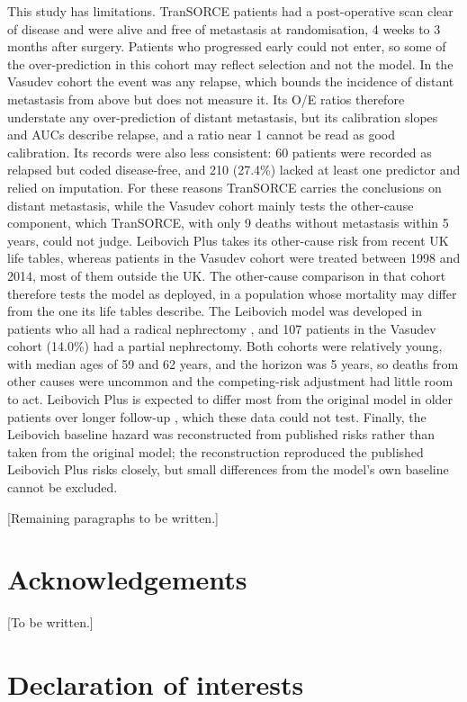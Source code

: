 \documentclass[11pt,a4paper]{article}
\begin{document}
This study has limitations.
TranSORCE patients had a post-operative scan clear of disease and were alive and free of metastasis at randomisation, 4 weeks to 3 months after surgery.
Patients who progressed early could not enter, so some of the over-prediction in this cohort may reflect selection and not the model.
In the Vasudev cohort the event was any relapse, which bounds the incidence of distant metastasis from above but does not measure it.
Its O/E ratios therefore understate any over-prediction of distant metastasis, but its calibration slopes and AUCs describe relapse, and a ratio near 1 cannot be read as good calibration.
Its records were also less consistent: 60 patients were recorded as relapsed but coded disease-free, and 210 (27.4\%) lacked at least one predictor and relied on imputation.
For these reasons TranSORCE carries the conclusions on distant metastasis, while the Vasudev cohort mainly tests the other-cause component, which TranSORCE, with only 9 deaths without metastasis within 5 years, could not judge.
Leibovich Plus takes its other-cause risk from recent UK life tables, whereas patients in the Vasudev cohort were treated between 1998 and 2014, most of them outside the UK.
The other-cause comparison in that cohort therefore tests the model as deployed, in a population whose mortality may differ from the one its life tables describe.
The Leibovich model was developed in patients who all had a radical nephrectomy \cite{Leibovich_2003}, and 107 patients in the Vasudev cohort (14.0\%) had a partial nephrectomy.
Both cohorts were relatively young, with median ages of 59 and 62 years, and the horizon was 5 years, so deaths from other causes were uncommon and the competing-risk adjustment had little room to act.
Leibovich Plus is expected to differ most from the original model in older patients over longer follow-up \cite{Stimpson_2025}, which these data could not test.
Finally, the Leibovich baseline hazard was reconstructed from published risks rather than taken from the original model; the reconstruction reproduced the published Leibovich Plus risks closely, but small differences from the model's own baseline cannot be excluded.

[Remaining paragraphs to be written.]

\section*{Acknowledgements}

[To be written.]

\section*{Declaration of interests}
\end{document}
